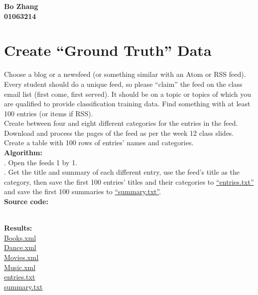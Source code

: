 \documentclass{article}
\begin{document}
		\begin{center}\textbf{Bo Zhang\\01063214}
		\end{center}
		\section{Create ``Ground Truth'' Data}
		Choose a blog or a newsfeed (or something similar with an Atom or RSS feed). Every student should do a unique feed, so please ``claim'' the feed on the class email list (first come, first served). It should be on a topic or topics of which you are qualified to provide classification training data. Find something with at least 100 entries (or items if RSS).\\
		\indent Create between four and eight different categories for the entries in the feed. Download and process the pages of the feed as per the week 12 class slides. Create a table with 100 rows of entries' names and categories.\\

		\noindent\textbf{Algorithm: }\\
		. Open the feeds 1 by 1.\\
		. Get the title and summary of each different entry, use the feed's title as the category, then save the first 100 entries' titles and their categories to \href{https://github.com/zhangboroy/cs532-s17/blob/master/assg09_submission/entries.txt}{``entries.txt''} and save the first 100 summaries to \href{https://github.com/zhangboroy/cs532-s17/blob/master/assg09_submission/summary.txt}{``summary.txt''}.\\

		\noindent\textbf{Source code:}
		

		\noindent\\\textbf{Results:}\\
		\indent\href{https://github.com/zhangboroy/cs532-s17/blob/master/assg09_submission/Books.xml}{Books.xml}\\
		\indent\href{https://github.com/zhangboroy/cs532-s17/blob/master/assg09_submission/Dance.xml}{Dance.xml}\\
		\indent\href{https://github.com/zhangboroy/cs532-s17/blob/master/assg09_submission/Movies.xml}{Movies.xml}\\
		\indent\href{https://github.com/zhangboroy/cs532-s17/blob/master/assg09_submission/Music.xml}{Music.xml}\\
		\indent\href{https://github.com/zhangboroy/cs532-s17/blob/master/assg09_submission/entries.txt}{entries.txt}\\
		\indent\href{https://github.com/zhangboroy/cs532-s17/blob/master/assg09_submission/summary.txt}{summary.txt}\\
\end{document}
